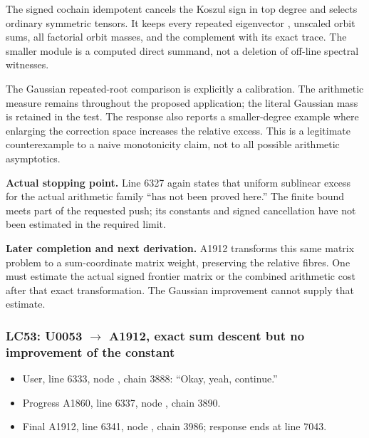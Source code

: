 \documentclass[10pt,a4paper,oneside]{report}
\providecommand{\tightlist}{\setlength{\itemsep}{0pt}\setlength{\parskip}{0pt}}
\begin{document}
The signed cochain idempotent \protect{}
cancels the Koszul sign in top degree and selects ordinary symmetric
tensors. It keeps every repeated eigenvector
\protect{}, unscaled orbit sums, all factorial orbit
masses, and the complement with its exact trace. The smaller module is a
computed direct summand, not a deletion of off-line spectral witnesses.

The Gaussian repeated-root comparison is explicitly a calibration. The
arithmetic measure remains \protect{} throughout
the proposed application; the literal Gaussian mass
\protect{} is retained in the test. The response also
reports a smaller-degree example where enlarging the correction space
increases the relative excess. This is a legitimate counterexample to a
naive monotonicity claim, not to all possible arithmetic asymptotics.

\textbf{Actual stopping point.} Line 6327 again states that uniform
sublinear excess for the actual arithmetic family ``has not been proved
here.'' The finite bound meets part of the requested push; its constants
and signed cancellation have not been estimated in the required limit.

\textbf{Later completion and next derivation.} A1912 transforms this
same matrix problem to a sum-coordinate matrix weight, preserving the
relative fibres. One must estimate the actual signed frontier matrix or
the combined arithmetic \protect{} cost after that
exact transformation. The Gaussian improvement cannot supply that
estimate.

\subsubsection{\texorpdfstring{LC53: U0053
\allowbreak{}\ensuremath{→}\allowbreak{} A1912, exact sum descent but no
improvement of the
constant}{LC53: U0053  A1912, exact sum descent but no improvement of the constant}}\label{lc53-u0053-a1912-exact-sum-descent-but-no-improvement-of-the-constant}

\begin{itemize}
\tightlist
\item
  User, line 6333, node
  \protect{}, chain 3888:
  ``Okay, yeah, continue.''
\item
  Progress A1860, line 6337, node
  \protect{}, chain 3890.
\item
  Final A1912, line 6341, node
  \protect{}, chain 3986;
  response ends at line 7043.
\end{itemize}
\end{document}

